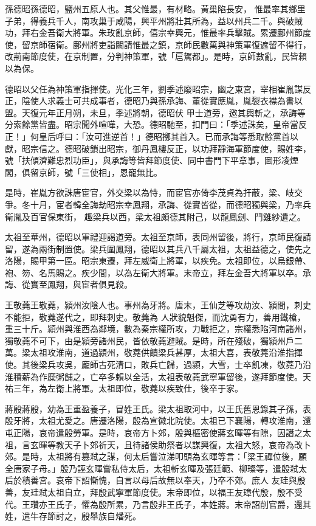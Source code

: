 \begin{pinyinscope}
 孫德昭孫德昭，鹽州五原人也。其父惟最，有材略。黃巢陷長安，
 惟最率其鄉里子弟，得義兵千人，南攻巢于咸陽，興平州將壯其所為，益以州兵二千。與破賊功，拜右金吾衛大將軍。朱玫亂京師，僖宗幸興元，惟最率兵擊賊。累遷鄜州節度使，留京師宿衛。鄜州將吏詣闕請惟最之鎮，京師民數萬與神策軍復遮留不得行，改荊南節度使，在京制置，分判神策軍，號「扈駕都」。是時，京師數亂，民皆賴以為保。



 德昭以父任為神策軍指揮使。光化三年，劉季述廢昭宗，幽之東宮，宰相崔胤謀反正，陰使人求義士可共成事者，德昭乃與孫承誨、董從實應胤，胤裂衣襟為書以盟。天復元年正月朔，未旦，季述將朝，德昭伏
 甲士道旁，邀其輿斬之，承誨等分索餘黨皆盡。昭宗聞外喧嘩，大恐。德昭馳至，扣門曰：「季述誅矣，皇帝當反正！」何皇后呼曰：「汝可進逆首！」德昭擲其首入。已而承誨等悉取餘黨首以獻，昭宗信之。德昭破鎖出昭宗，御丹鳳樓反正，以功拜靜海軍節度使，賜姓李，號「扶傾濟難忠烈功臣」，與承誨等皆拜節度使、同中書門下平章事，圖形凌煙閣，俱留京師，號「三使相」，恩寵無比。



 是時，崔胤方欲誅唐宦官，外交梁以為恃，而宦官亦倚李茂貞為扞蔽，梁、岐交爭。冬十月，宦者韓全誨劫昭宗幸鳳翔，承誨、從實皆從，而德昭獨與梁，乃率兵衛胤及百官保東街，
 趣梁兵以西，梁太祖頗德其附己，以龍鳳劍、鬥雞紗遺之。



 太祖至華州，德昭以軍禮迎謁道旁。太祖至京師，表同州留後，將行，京師民復請留，遂為兩街制置使。梁兵圍鳳翔，德昭以其兵八千屬太祖，太祖益德之，使先之洛陽，賜甲第一區。昭宗東遷，拜左威衛上將軍，以疾免。太祖即位，以烏銀帶、袍、笏、名馬賜之。疾少間，以為左衛大將軍。末帝立，拜左金吾大將軍以卒。承誨、從實至鳳翔，與宦者俱見殺。



 王敬蕘王敬蕘，潁州汝陰人也。事州為牙將。唐末，王仙芝等攻劫汝、潁間，刺史不能拒，敬蕘遂代之，即拜刺史。敬蕘為
 人狀貌魁傑，而沈勇有力，善用鐵槍，重三十斤。潁州與淮西為鄰境，數為秦宗權所攻，力戰拒之，宗權悉陷河南諸州，獨敬蕘不可下，由是潁旁諸州民，皆依敬蕘避賊。是時，所在殘破，獨潁州戶二萬。梁太祖攻淮南，道過潁州，敬蕘供饋梁兵甚厚，太祖大喜，表敬蕘沿淮指揮使。其後梁兵攻吳，龐師古死清口，敗兵亡歸，過潁，大雪，士卒飢凍，敬蕘乃沿淮積薪為作糜粥餔之，亡卒多賴以全活，太祖表敬蕘武寧軍留後，遂拜節度使。天祐三年，為左衛上將軍。太祖即位，敬蕘以疾致仕，後卒于家。



 蔣殷蔣殷，幼為王重盈養子，冒姓王氏。梁太祖取河中，以王氏舊恩錄其子孫，表殷牙將，太祖尤愛之。唐遷洛陽，殷為宣徽北院使。太祖已下襄陽，轉攻淮南，還屯正陽，哀帝遣殷勞軍。是時，哀帝方卜郊，殷與樞密使蔣玄暉等有隙，因譖之太祖，言玄暉等教天子卜郊祈天，且待諸侯助祭者以謀興復，太祖大怒，哀帝為改卜郊。是時，太祖將有篡弒之謀，何太后嘗泣涕叩頭為玄暉等言：「梁王禪位後，願全唐家子母。」殷乃誣玄暉嘗私侍太后，太祖斬玄暉及張廷範、柳璨等，遣殷弒太后於積善宮。哀帝下詔慚愧，自言以母后故無以奉天，乃卒不郊。庶人
 友珪與殷善，友珪弒太祖自立，拜殷武寧軍節度使。末帝即位，以福王友璋代殷，殷不受代。王瓚亦王氏子，懼為殷所累，乃言殷非王氏子，本姓蔣。末帝詔削官爵，還其姓，遣牛存節討之，殷舉族自燔死。



\end{pinyinscope}